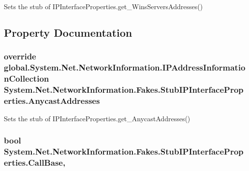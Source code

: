Sets the stub of I\-P\-Interface\-Properties.\-get\-\_\-\-Wins\-Servers\-Addresses()



\subsection{Property Documentation}
\hypertarget{class_system_1_1_net_1_1_network_information_1_1_fakes_1_1_stub_i_p_interface_properties_acd2a9a7f3c28493b979ec61e5061eeed}{
\subsubsection[{Anycast\-Addresses}]{\setlength{\rightskip}{0pt plus 5cm}override global.\-System.\-Net.\-Network\-Information.\-I\-P\-Address\-Information\-Collection System.\-Net.\-Network\-Information.\-Fakes.\-Stub\-I\-P\-Interface\-Properties.\-Anycast\-Addresses\hspace{0.3cm}{\ttfamily [get]}}}\label{class_system_1_1_net_1_1_network_information_1_1_fakes_1_1_stub_i_p_interface_properties_acd2a9a7f3c28493b979ec61e5061eeed}


Sets the stub of I\-P\-Interface\-Properties.\-get\-\_\-\-Anycast\-Addresses()

\hypertarget{class_system_1_1_net_1_1_network_information_1_1_fakes_1_1_stub_i_p_interface_properties_a1dd9ca8840d2cdda7cdb46ec68566a51}{
\subsubsection[{Call\-Base}]{\setlength{\rightskip}{0pt plus 5cm}bool System.\-Net.\-Network\-Information.\-Fakes.\-Stub\-I\-P\-Interface\-Properties.\-Call\-Base\hspace{0.3cm}{\ttfamily [get]}, {\ttfamily [set]}}}\label{class_system_1_1_net_1_1_network_information_1_1_fakes_1_1_stub_i_p_interface_properties_a1dd9ca8840d2cdda7cdb46ec68566a51}


